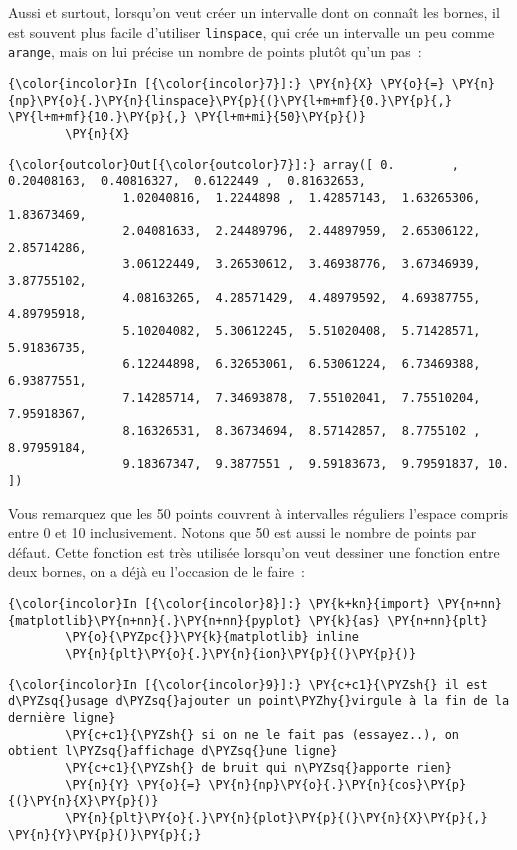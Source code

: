     Aussi et surtout, lorsqu'on veut créer un intervalle dont on connaît les
bornes, il est souvent plus facile d'utiliser \texttt{linspace}, qui
crée un intervalle un peu comme \texttt{arange}, mais on lui précise un
nombre de points plutôt qu'un pas~:

    \begin{Verbatim}[commandchars=\\\{\}]
{\color{incolor}In [{\color{incolor}7}]:} \PY{n}{X} \PY{o}{=} \PY{n}{np}\PY{o}{.}\PY{n}{linspace}\PY{p}{(}\PY{l+m+mf}{0.}\PY{p}{,} \PY{l+m+mf}{10.}\PY{p}{,} \PY{l+m+mi}{50}\PY{p}{)}
        \PY{n}{X}
\end{Verbatim}


\begin{Verbatim}[commandchars=\\\{\}]
{\color{outcolor}Out[{\color{outcolor}7}]:} array([ 0.        ,  0.20408163,  0.40816327,  0.6122449 ,  0.81632653,
                1.02040816,  1.2244898 ,  1.42857143,  1.63265306,  1.83673469,
                2.04081633,  2.24489796,  2.44897959,  2.65306122,  2.85714286,
                3.06122449,  3.26530612,  3.46938776,  3.67346939,  3.87755102,
                4.08163265,  4.28571429,  4.48979592,  4.69387755,  4.89795918,
                5.10204082,  5.30612245,  5.51020408,  5.71428571,  5.91836735,
                6.12244898,  6.32653061,  6.53061224,  6.73469388,  6.93877551,
                7.14285714,  7.34693878,  7.55102041,  7.75510204,  7.95918367,
                8.16326531,  8.36734694,  8.57142857,  8.7755102 ,  8.97959184,
                9.18367347,  9.3877551 ,  9.59183673,  9.79591837, 10.        ])
\end{Verbatim}
            
    Vous remarquez que les 50 points couvrent à intervalles réguliers
l'espace compris entre 0 et 10 inclusivement. Notons que 50 est aussi le
nombre de points par défaut. Cette fonction est très utilisée lorsqu'on
veut dessiner une fonction entre deux bornes, on a déjà eu l'occasion de
le faire~:

    \begin{Verbatim}[commandchars=\\\{\}]
{\color{incolor}In [{\color{incolor}8}]:} \PY{k+kn}{import} \PY{n+nn}{matplotlib}\PY{n+nn}{.}\PY{n+nn}{pyplot} \PY{k}{as} \PY{n+nn}{plt}
        \PY{o}{\PYZpc{}}\PY{k}{matplotlib} inline
        \PY{n}{plt}\PY{o}{.}\PY{n}{ion}\PY{p}{(}\PY{p}{)}
\end{Verbatim}


    \begin{Verbatim}[commandchars=\\\{\}]
{\color{incolor}In [{\color{incolor}9}]:} \PY{c+c1}{\PYZsh{} il est d\PYZsq{}usage d\PYZsq{}ajouter un point\PYZhy{}virgule à la fin de la dernière ligne}
        \PY{c+c1}{\PYZsh{} si on ne le fait pas (essayez..), on obtient l\PYZsq{}affichage d\PYZsq{}une ligne}
        \PY{c+c1}{\PYZsh{} de bruit qui n\PYZsq{}apporte rien}
        \PY{n}{Y} \PY{o}{=} \PY{n}{np}\PY{o}{.}\PY{n}{cos}\PY{p}{(}\PY{n}{X}\PY{p}{)}
        \PY{n}{plt}\PY{o}{.}\PY{n}{plot}\PY{p}{(}\PY{n}{X}\PY{p}{,} \PY{n}{Y}\PY{p}{)}\PY{p}{;}
\end{Verbatim}


